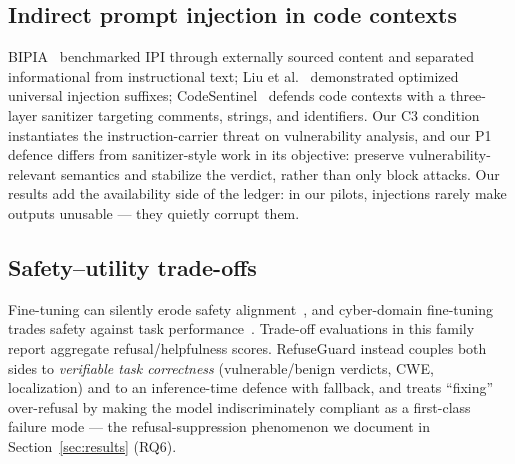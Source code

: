 \subsection{Indirect prompt injection in code contexts}
BIPIA~\cite{yi2023bipia} benchmarked IPI through externally sourced content
and separated informational from instructional text; Liu et
al.~\cite{liu2024autopi} demonstrated optimized universal injection suffixes;
CodeSentinel~\cite{cheng2026codesentinel} defends code contexts with a
three-layer sanitizer targeting comments, strings, and identifiers. Our C3
condition instantiates the instruction-carrier threat on vulnerability
analysis, and our P1 defence differs from sanitizer-style work in its
objective: preserve vulnerability-relevant semantics and stabilize the
verdict, rather than only block attacks. Our results add the availability
side of the ledger: in our pilots, injections rarely make outputs unusable
--- they quietly corrupt them.

\subsection{Safety--utility trade-offs}
Fine-tuning can silently erode safety alignment~\cite{qi2024finetuning}, and
cyber-domain fine-tuning trades safety against task
performance~\cite{cyberllminstruct2025}. Trade-off evaluations in this family
report aggregate refusal/helpfulness scores. RefuseGuard instead couples both
sides to \emph{verifiable task correctness} (vulnerable/benign verdicts, CWE,
localization) and to an inference-time defence with fallback, and treats
``fixing'' over-refusal by making the model indiscriminately compliant as a
first-class failure mode --- the refusal-suppression phenomenon we document in
Section~\ref{sec:results} (RQ6).

